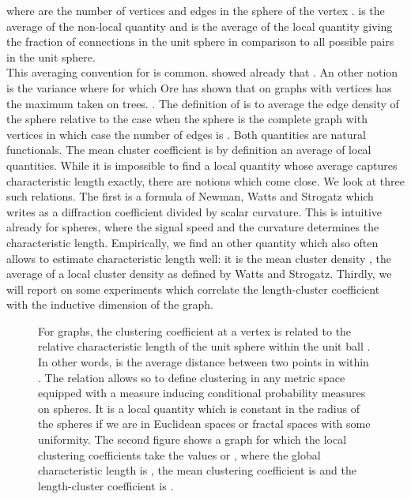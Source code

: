 \documentclass[12pt]{amsart}
\theoremstyle{definition}
\begin{document}
where  are the number of vertices and edges in the sphere  of the vertex . 
 is the average of the non-local quantity  and 
 is the average of the local quantity  giving the fraction of
connections in the unit sphere in comparison to all possible pairs in the unit sphere. \\

This averaging convention for  is common. \cite{DoyleGraver1} showed already that
. An other notion is the variance 
where  for which Ore has shown that on graphs with  vertices
has the maximum taken on trees. \cite{EntringerJacksonSnyder}. 
The definition of  is to average the edge density of the sphere relative to the case 
when the sphere is the complete graph with  vertices in which case the number 
of edges is . Both quantities are natural functionals. The
mean cluster coefficient  is by definition an average of local quantities. 
While it is impossible to find a local quantity whose average captures
characteristic length exactly, there are notions which come close. We look at three such 
relations. The first is a formula of Newman, Watts and Strogatz \cite{NewmanStrogatzWatts} 
which writes  as a diffraction coefficient divided by scalar curvature.
This is intuitive already for spheres, where the signal speed and the curvature determines
the characteristic length. Empirically, we find an other quantity which also often allows to estimate
characteristic length well: it is the mean cluster density , the average of a 
local cluster density  as defined by Watts and Strogatz. Thirdly, we will report on 
some experiments which correlate the length-cluster coefficient  
with the inductive dimension  of the graph. \\

\begin{figure}{
\caption{
For graphs, the clustering coefficient  at a vertex  is related to the relative 
characteristic length  of the unit sphere  within the unit ball . 
In other words,  is the average distance between two points in  within . 
The relation  allows so to define clustering in any metric space equipped
with a measure inducing conditional probability measures on spheres. It is 
a local quantity which is constant in the radius  of the spheres if we are in 
Euclidean spaces or fractal spaces with some uniformity.
The second figure shows a graph for which the local clustering coefficients  take the 
values  or , where the global characteristic length is , 
the mean clustering coefficient is  and
the length-cluster coefficient  is . }
\label{clustering}
}
\end{figure}
\end{document}
